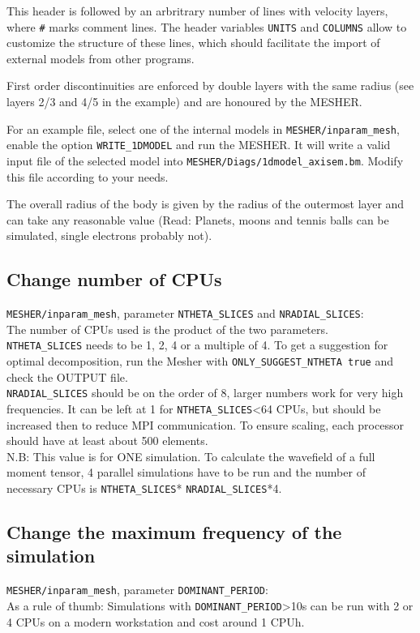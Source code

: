\documentclass{article}
\begin{document}
This header is followed by an arbritrary number of lines with velocity layers, where \verb|#| marks comment lines. The header variables \verb|UNITS| and \verb|COLUMNS| allow to customize the structure of these lines, which should facilitate the import of external models from other programs.

First order discontinuities are enforced by double layers with the same radius (see layers 2/3 and 4/5
in the example) and are honoured by the MESHER.

For an example file, select one of the internal models in \verb|MESHER/inparam_mesh|, enable the option \verb|WRITE_1DMODEL| and run the MESHER. It will write a valid input file of the selected model into \verb|MESHER/Diags/1dmodel_axisem.bm|. Modify this file according to your needs.

The overall radius of the body is given by the radius of the outermost layer and can take
any reasonable value (Read: Planets, moons and tennis balls can be simulated, single electrons probably not).

\subsection{Change number of CPUs}

\verb|MESHER/inparam_mesh|, parameter \verb|NTHETA_SLICES| and \verb|NRADIAL_SLICES|: \\
The number of CPUs used is the product of the two parameters. \\
\verb|NTHETA_SLICES| needs to be 1, 2, 4 or a multiple of 4. To get a suggestion for
optimal decomposition, run the Mesher with \verb|ONLY_SUGGEST_NTHETA true| and check the
OUTPUT file.\\
\verb|NRADIAL_SLICES| should be on the order of 8, larger numbers work for very high
frequencies. It can be left at 1 for \verb|NTHETA_SLICES|<64 CPUs, but should be increased
then to reduce MPI communication. To ensure scaling, each processor should have at least
about 500 elements.\\
N.B: This value is for ONE simulation. To calculate the wavefield of a full moment tensor,
4 parallel simulations have to be run and the number of necessary CPUs is
\verb|NTHETA_SLICES|* \verb|NRADIAL_SLICES|*4.


\subsection{Change the maximum frequency of the simulation}
\verb|MESHER/inparam_mesh|, parameter \verb|DOMINANT_PERIOD|: \\
As a rule of thumb: Simulations with \verb|DOMINANT_PERIOD|>10s can be run with 2 or 4
CPUs on a modern workstation and cost around 1 CPUh.
\end{document}
